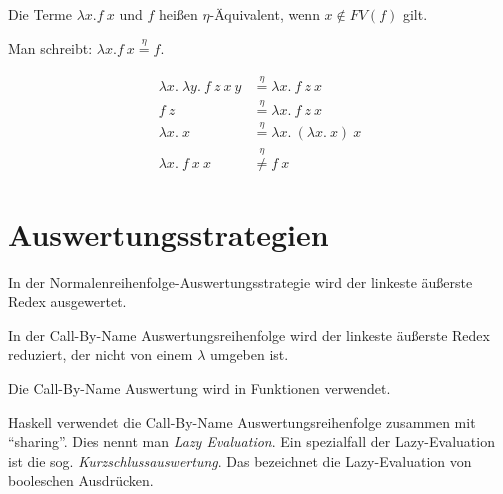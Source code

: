 \begin{definition}%
    Die Terme $\lambda x. f~x$ und $f$ heißen $\eta$-Äquivalent, wenn $x \notin FV(f)$ gilt.

    Man schreibt: $\lambda x. f~x \overset{\eta}{=} f$.
\end{definition}

\begin{beispiel}%
    \begin{align*}
        \lambda x.\ \lambda y.\ f\ z\ x\ y &\overset{\eta}{=} \lambda x.\ f\ z\ x\\
        f\ z                &\overset{\eta}{=} \lambda x.\ f\ z\ x\\
        \lambda x.\ x       &\overset{\eta}{=} \lambda x.\ (\lambda x.\ x)\ x\\
        \lambda x.\ f\ x\ x &\overset{\eta}{\neq} f\ x
    \end{align*}
\end{beispiel}

\section{Auswertungsstrategien}
\begin{definition}[Normalenreihenfolge]%
    In der Normalenreihenfolge-Auswertungsstrategie wird der linkeste äußerste
    Redex ausgewertet.
\end{definition}

\begin{definition}%
    In der Call-By-Name Auswertungsreihenfolge wird der linkeste äußerste Redex
    reduziert, der nicht von einem $\lambda$ umgeben ist.
\end{definition}

Die Call-By-Name Auswertung wird in Funktionen verwendet.

Haskell verwendet die Call-By-Name Auswertungsreihenfolge zusammen mit \enquote{sharing}. Dies nennt man \textit{Lazy Evaluation}. Ein spezialfall der Lazy-Evaluation ist die sog. \textit{Kurzschlussauswertung}.
Das bezeichnet die Lazy-Evaluation von booleschen Ausdrücken.


